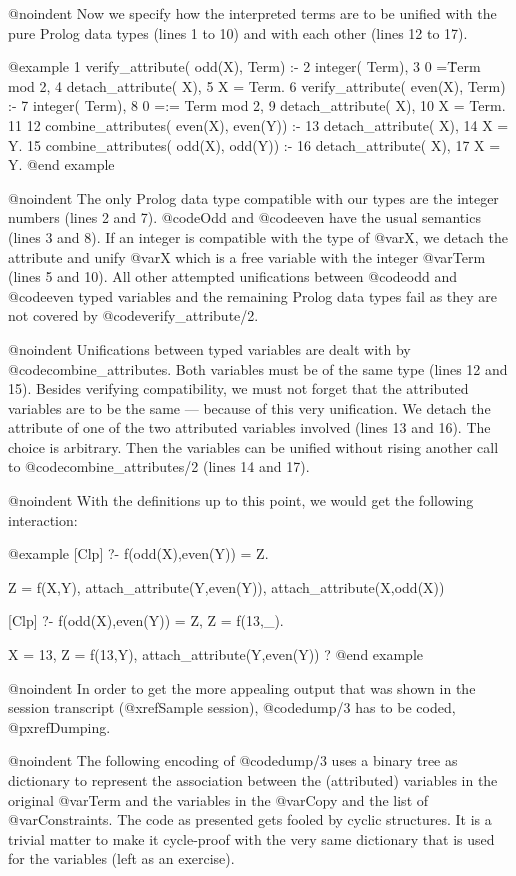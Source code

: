@noindent
Now we specify how the interpreted terms are to be unified with the pure
Prolog data types (lines 1 to 10) and with each other (lines 12 to 17).

@example
     1	verify_attribute( odd(X), Term) :-
     2	  integer( Term),
     3	  0 =\= Term mod 2,
     4	  detach_attribute( X),
     5	  X = Term.   
     6	verify_attribute( even(X), Term) :-
     7	  integer( Term),
     8	  0 =:= Term mod 2,
     9	  detach_attribute( X),
    10	  X = Term.
    11	
    12	combine_attributes( even(X), even(Y)) :-
    13	  detach_attribute( X),
    14	  X = Y.   
    15	combine_attributes( odd(X),  odd(Y)) :-
    16	  detach_attribute( X),
    17	  X = Y.
@end example

@noindent
The only Prolog data type compatible with our types are the integer
numbers (lines 2 and 7). @code{Odd} and @code{even} have the usual
semantics (lines 3 and 8). If an integer is compatible with the type of
@var{X}, we detach the attribute and unify @var{X} which is a free
variable with the integer @var{Term} (lines 5 and 10).  All other
attempted unifications between @code{odd} and @code{even} typed
variables and the remaining Prolog data types fail as they are not
covered by @code{verify_attribute/2}.

@noindent
Unifications between typed variables are dealt with by
@code{combine_attributes}. Both variables must be of the same type
(lines 12 and 15). Besides verifying compatibility, we must not forget
that the attributed variables are to be the same --- because of this
very unification. We detach the attribute of one of the two attributed
variables involved (lines 13 and 16). The choice is arbitrary.  Then the
variables can be unified without rising another call to
@code{combine_attributes/2} (lines 14 and 17).

@noindent
With the definitions up to this point, we would get the following
interaction:

@example
[Clp] ?- f(odd(X),even(Y)) = Z.

Z = f(X,Y),
attach_attribute(Y,even(Y)),
attach_attribute(X,odd(X)) 

[Clp] ?- f(odd(X),even(Y)) = Z, Z = f(13,_).

X = 13,
Z = f(13,Y),
attach_attribute(Y,even(Y)) ? 
@end example

@noindent
In order to get the more appealing output that was shown in the session
transcript (@xref{Sample session}), @code{dump/3} has to be coded,
@pxref{Dumping}.

@noindent
The following encoding of @code{dump/3} uses a binary tree as dictionary
to represent the association between the (attributed) variables in the original
@var{Term} and the variables in the @var{Copy} and the list of @var{Constraints}.
The code as presented gets fooled by cyclic structures. It is a trivial matter
to make it cycle-proof with the very same dictionary that is used for the 
variables (left as an exercise).

